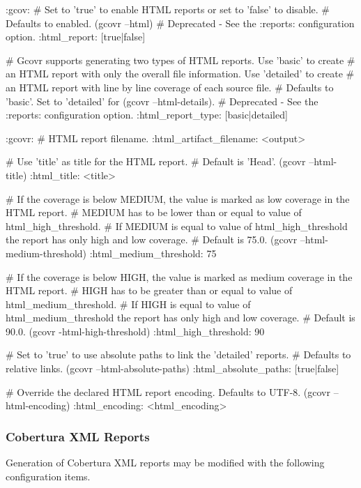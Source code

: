\begin{DoxyCode}
:gcov:
  # Set to 'true' to enable HTML reports or set to 'false' to disable.
  # Defaults to enabled. (gcovr --html)
  # Deprecated - See the :reports: configuration option.
  :html\_report: [true|false]

  # Gcovr supports generating two types of HTML reports. Use 'basic' to create
  # an HTML report with only the overall file information. Use 'detailed' to create
  # an HTML report with line by line coverage of each source file.
  # Defaults to 'basic'. Set to 'detailed' for (gcovr --html-details).
  # Deprecated - See the :reports: configuration option.
  :html\_report\_type: [basic|detailed]


  :gcovr:
    # HTML report filename.
    :html\_artifact\_filename: <output>

    # Use 'title' as title for the HTML report.
    # Default is 'Head'. (gcovr --html-title)
    :html\_title: <title>

    # If the coverage is below MEDIUM, the value is marked as low coverage in the HTML report.
    # MEDIUM has to be lower than or equal to value of html\_high\_threshold.
    # If MEDIUM is equal to value of html\_high\_threshold the report has only high and low coverage.
    # Default is 75.0. (gcovr --html-medium-threshold)
    :html\_medium\_threshold: 75

    # If the coverage is below HIGH, the value is marked as medium coverage in the HTML report.
    # HIGH has to be greater than or equal to value of html\_medium\_threshold.
    # If HIGH is equal to value of html\_medium\_threshold the report has only high and low coverage.
    # Default is 90.0. (gcovr -html-high-threshold)
    :html\_high\_threshold: 90

    # Set to 'true' to use absolute paths to link the 'detailed' reports.
    # Defaults to relative links. (gcovr --html-absolute-paths)
    :html\_absolute\_paths: [true|false]

    # Override the declared HTML report encoding. Defaults to UTF-8. (gcovr --html-encoding)
    :html\_encoding: <html\_encoding>
\end{DoxyCode}


\subsubsection*{Cobertura X\+ML Reports}

Generation of Cobertura X\+ML reports may be modified with the following configuration items.


